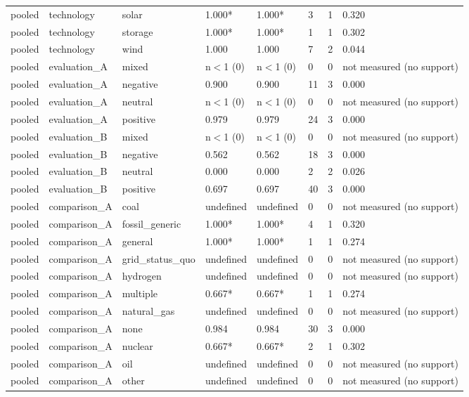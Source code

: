 \begin{table}[htbp]
\begin{tabular}{llllllll}
pooled & technology & solar & 1.000* & 1.000* & 3 & 1 & 0.320 \\
pooled & technology & storage & 1.000* & 1.000* & 1 & 1 & 0.302 \\
pooled & technology & wind & 1.000 & 1.000 & 7 & 2 & 0.044 \\
pooled & evaluation\_A & mixed & n$<$1 (0) & n$<$1 (0) & 0 & 0 & not measured (no support) \\
pooled & evaluation\_A & negative & 0.900 & 0.900 & 11 & 3 & 0.000 \\
pooled & evaluation\_A & neutral & n$<$1 (0) & n$<$1 (0) & 0 & 0 & not measured (no support) \\
pooled & evaluation\_A & positive & 0.979 & 0.979 & 24 & 3 & 0.000 \\
pooled & evaluation\_B & mixed & n$<$1 (0) & n$<$1 (0) & 0 & 0 & not measured (no support) \\
pooled & evaluation\_B & negative & 0.562 & 0.562 & 18 & 3 & 0.000 \\
pooled & evaluation\_B & neutral & 0.000 & 0.000 & 2 & 2 & 0.026 \\
pooled & evaluation\_B & positive & 0.697 & 0.697 & 40 & 3 & 0.000 \\
pooled & comparison\_A & coal & undefined & undefined & 0 & 0 & not measured (no support) \\
pooled & comparison\_A & fossil\_generic & 1.000* & 1.000* & 4 & 1 & 0.320 \\
pooled & comparison\_A & general & 1.000* & 1.000* & 1 & 1 & 0.274 \\
pooled & comparison\_A & grid\_status\_quo & undefined & undefined & 0 & 0 & not measured (no support) \\
pooled & comparison\_A & hydrogen & undefined & undefined & 0 & 0 & not measured (no support) \\
pooled & comparison\_A & multiple & 0.667* & 0.667* & 1 & 1 & 0.274 \\
pooled & comparison\_A & natural\_gas & undefined & undefined & 0 & 0 & not measured (no support) \\
pooled & comparison\_A & none & 0.984 & 0.984 & 30 & 3 & 0.000 \\
pooled & comparison\_A & nuclear & 0.667* & 0.667* & 2 & 1 & 0.302 \\
pooled & comparison\_A & oil & undefined & undefined & 0 & 0 & not measured (no support) \\
pooled & comparison\_A & other & undefined & undefined & 0 & 0 & not measured (no support) \\

\end{tabular}
\end{table}
